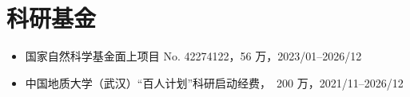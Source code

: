 \section{科研基金}

\begin{itemize}
\item 国家自然科学基金面上项目 No. 42274122，56 万，2023/01--2026/12
\item 中国地质大学（武汉）“百人计划”科研启动经费，\textyen\ 200 万，2021/11--2026/12
\end{itemize}
